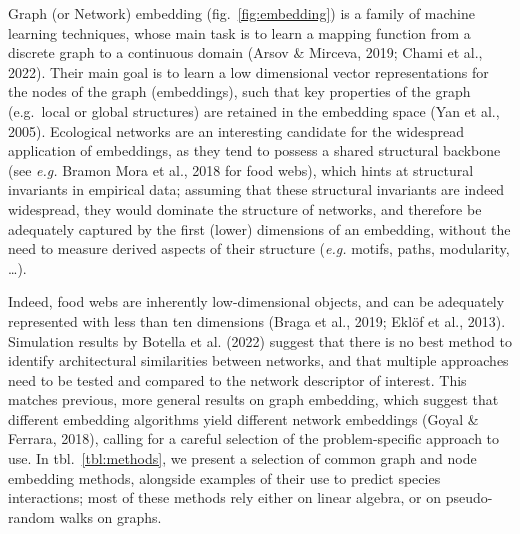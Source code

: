 \documentclass[11pt]{article}
\begin{document}
Graph (or Network) embedding (fig.~\ref{fig:embedding}) is a family of
machine learning techniques, whose main task is to learn a mapping
function from a discrete graph to a continuous domain (Arsov \& Mirceva,
2019; Chami et al., 2022). Their main goal is to learn a low dimensional
vector representations for the nodes of the graph (embeddings), such
that key properties of the graph (e.g.~local or global structures) are
retained in the embedding space (Yan et al., 2005). Ecological networks
are an interesting candidate for the widespread application of
embeddings, as they tend to possess a shared structural backbone (see
\emph{e.g.} Bramon Mora et al., 2018 for food webs), which hints at
structural invariants in empirical data; assuming that these structural
invariants are indeed widespread, they would dominate the structure of
networks, and therefore be adequately captured by the first (lower)
dimensions of an embedding, without the need to measure derived aspects
of their structure (\emph{e.g.} motifs, paths, modularity, \ldots).

Indeed, food webs are inherently low-dimensional objects, and can be
adequately represented with less than ten dimensions (Braga et al.,
2019; Eklöf et al., 2013). Simulation results by Botella et al. (2022)
suggest that there is no best method to identify architectural
similarities between networks, and that multiple approaches need to be
tested and compared to the network descriptor of interest. This matches
previous, more general results on graph embedding, which suggest that
different embedding algorithms yield different network embeddings (Goyal
\& Ferrara, 2018), calling for a careful selection of the
problem-specific approach to use. In tbl.~\ref{tbl:methods}, we present
a selection of common graph and node embedding methods, alongside
examples of their use to predict species interactions; most of these
methods rely either on linear algebra, or on pseudo-random walks on
graphs.
\end{document}
